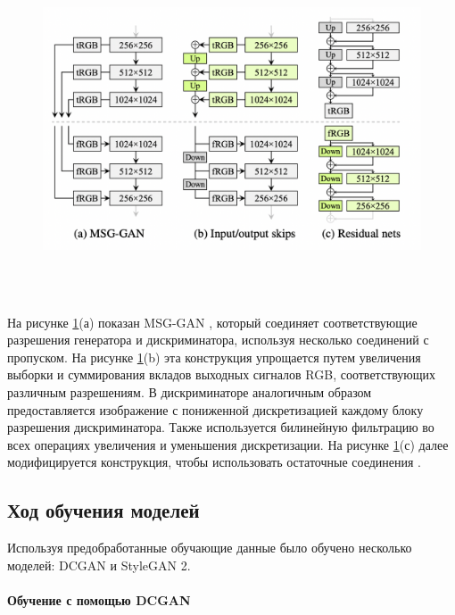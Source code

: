 \begin{figure}
    \centering
    \includegraphics[height=100mm]{fig/stylegan2_generator.png}
    \caption{}
    \label{fig.stylegan2_generator}
\end{figure}

На рисунке {\color{blue} \ref{fig.stylegan2_generator}}(а) показан MSG-GAN  \cite{MSG_GAN}, который соединяет соответствующие разрешения генератора и дискриминатора, используя несколько соединений с пропуском. На рисунке {\color{blue} \ref{fig.stylegan2_generator}}(b) эта конструкция упрощается путем увеличения выборки и суммирования вкладов выходных сигналов RGB, соответствующих различным разрешениям. В дискриминаторе аналогичным образом предоставляется изображение с пониженной дискретизацией каждому блоку разрешения дискриминатора. Также используется билинейную фильтрацию во всех операциях увеличения и уменьшения дискретизации. На рисунке {\color{blue} \ref{fig.stylegan2_generator}}(с) далее модифицируется конструкция, чтобы использовать остаточные соединения \cite{StyleGAN2}.

\subsection{Ход обучения моделей}

Используя предобработанные обучающие данные было обучено несколько моделей: DCGAN и StyleGAN 2.

\paragraph{Обучение с помощью DCGAN}

